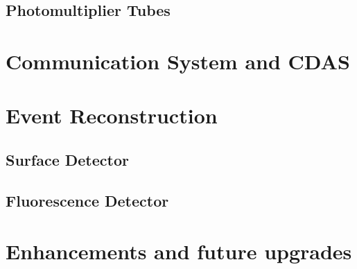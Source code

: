 \subsection{Photomultiplier Tubes}

\section{Communication System and CDAS}

\section{Event Reconstruction}

\subsection{Surface Detector}

\subsection{Fluorescence Detector}

\section{Enhancements and future upgrades}